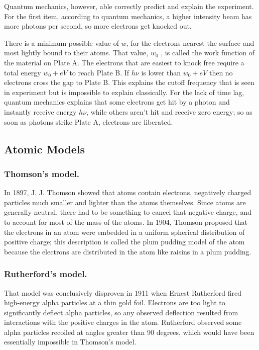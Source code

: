 \documentclass[../../../main.tex]{subfiles}
\begin{document}
Quantum mechanics, however, able correctly predict and explain the experiment. For the first item, according to quantum mechanics, a higher intensity beam has more photons per second, so more electrons get knocked out. 

There is a minimum possible value of $w$, for the electrons nearest the surface and most lightly bound to their atoms. That value, $w_0$ , is called the work function of the material on Plate A. The electrons that are easiest to knock free require a total energy $w_0 + eV $ to reach Plate B. If $h\nu$ is lower than $w_0 + eV$ then no electrons cross the gap to Plate B. This explains the cutoff frequency that is seen in experiment but is impossible to explain classically. For the lack of time lag, quantum mechanics explains that some electrons get hit by a photon and instantly receive energy $h\nu$, while others aren't hit and receive zero energy; so as soon as photons strike Plate A, electrons are liberated.

\subsection{Atomic Models}
\subsubsection{Thomson's model.} In 1897, J. J. Thomson showed that atoms contain electrons, negatively charged particles much smaller and lighter than the atoms themselves. Since atoms are generally neutral, there had to be something to cancel that negative charge, and to account for most of the mass of the atoms. In 1904, Thomson proposed that the electrons in an atom were embedded in a uniform spherical distribution of positive charge; this description is called the plum pudding model of the atom because the electrons are distributed in the atom like raisins in a plum pudding.

\subsubsection{Rutherford's model.} That model was conclusively disproven in 1911 when Ernest Rutherford fired high-energy alpha particles at a thin gold foil. Electrons are too light to significantly deflect alpha particles, so any observed deflection resulted from interactions with the positive charges in the atom. Rutherford observed some alpha particles recoiled at angles greater than 90 degrees, which would have been essentially impossible in Thomson's model. 
\end{document}
